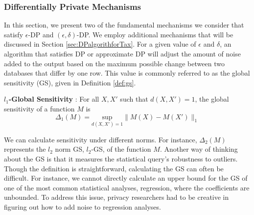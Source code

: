 \subsubsection{Differentially Private Mechanisms}\label{subsec:mech}
In this section, we present two of the fundamental mechanisms we consider that satisfy $\epsilon$-DP and $(\epsilon, \delta)$-DP. We employ additional mechanisms that will be discussed in Section \ref{sec:DPalgorithforTax}. For a given value of $\epsilon$ and $\delta$, an algorithm that satisfies DP or approximate DP will adjust the amount of noise added to the output based on the maximum possible change between two databases that differ by one row. This value is commonly referred to as the global sensitivity (GS), given in Definition \ref{def:gs}.
\begin{defn}\label{def:gs} \textbf{$l_1$-Global Sensitivity} \citep{dwork2006calibrating}:
For all $X,X'$ such that $d(X,X')=1$, the global sensitivity of a function $M$ is
    \begin{equation}\label{eqn:gs}
        \Delta_1 (M)= \underset{d(X,X')=1}{\text{sup}} \|M(X)-M(X') \|_1 
    \end{equation}
\end{defn}
\vspace{-8pt}
We can calculate sensitivity under different norms. For instance, $\Delta_2(M)$ represents the $l_2$ norm GS, $l_2$-GS, of the function $M$. Another way of thinking about the GS is that it measures the statistical query's robustness to outliers. Though the definition is straightforward, calculating the GS can often be difficult. For instance, we cannot directly calculate an upper bound for the GS of one of the most common statistical analyses, regression, where the coefficients are unbounded. To address this issue, privacy researchers had to be creative in figuring out how to add noise to regression analyses.

